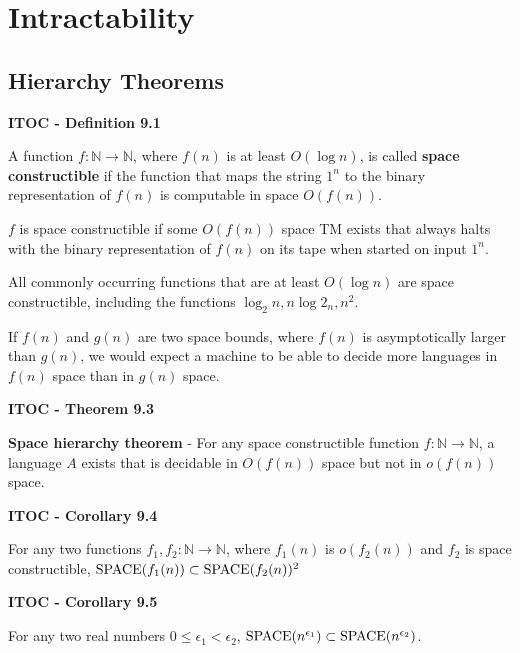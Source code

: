 \section{Intractability}

\subsection{Hierarchy Theorems}

\begin{shaded}
\textbf{ITOC - Definition 9.1}

\medskip
A function $f : \mathbb{N} \rightarrow \mathbb{N}$, where $f(n)$ is at least $O(\log n)$, is called \textbf{space constructible} if the function that maps the string $1^n$ to the binary representation of $f(n)$ is computable in space $O(f(n))$.
\end{shaded}

$f$ is space constructible if some $O(f(n))$ space TM exists that always halts with the binary representation of $f(n)$ on its tape when started on input $1^n$.

{\color{blue} All commonly occurring functions that are at least $O(\log n)$ are space constructible, including the functions $\log_2 n, n \log2_n, n^2$.}

If $f(n)$ and $g(n)$ are two space bounds, where $f(n)$ is asymptotically larger than $g(n)$, we would expect a machine to be able to decide more languages in $f(n)$ space than in $g(n)$ space.

\label{theo:9.3}
\begin{shaded}
\textbf{ITOC - Theorem 9.3}

\medskip
\textbf{Space hierarchy theorem} - For any space constructible function $f:\mathbb{N} \rightarrow \mathbb{N}$, a language $A$ exists that is decidable in $O(f(n))$ space but not in $o(f(n))$ space.
\end{shaded}

\begin{shaded}
\textbf{ITOC - Corollary 9.4}

\medskip
For any two functions $f_1, f_2: \mathbb{N} \rightarrow \mathbb{N}$, where $f_1(n)$ is $o(f_2(n))$ and $f_2$ is space constructible, $\text{SPACE}(f_1(n)) \subset \text{SPACE}(f_2(n))^2$
\end{shaded}

\begin{shaded}
\textbf{ITOC - Corollary 9.5}

\medskip
For any two real numbers $0 \leq \epsilon_1 < \epsilon_2$, $\text{SPACE}(n^{\epsilon_1}) \subset \text{SPACE}(n^{\epsilon_2})$.
\end{shaded}

